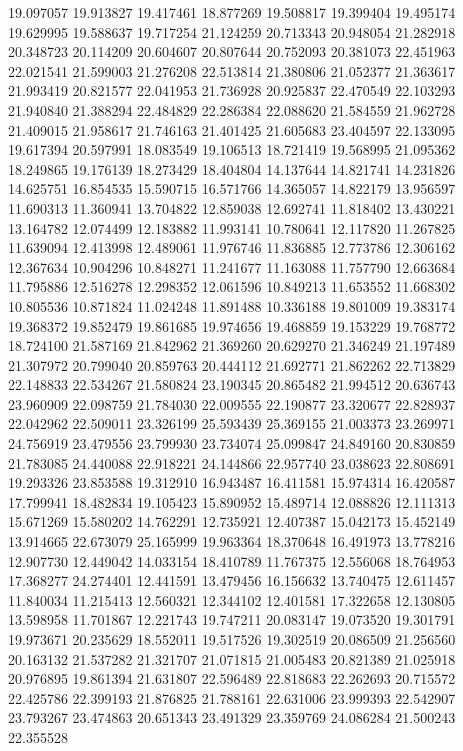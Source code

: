 19.097057
19.913827
19.417461
18.877269
19.508817
19.399404
19.495174
19.629995
19.588637
19.717254
21.124259
20.713343
20.948054
21.282918
20.348723
20.114209
20.604607
20.807644
20.752093
20.381073
22.451963
22.021541
21.599003
21.276208
22.513814
21.380806
21.052377
21.363617
21.993419
20.821577
22.041953
21.736928
20.925837
22.470549
22.103293
21.940840
21.388294
22.484829
22.286384
22.088620
21.584559
21.962728
21.409015
21.958617
21.746163
21.401425
21.605683
23.404597
22.133095
19.617394
20.597991
18.083549
19.106513
18.721419
19.568995
21.095362
18.249865
19.176139
18.273429
18.404804
14.137644
14.821741
14.231826
14.625751
16.854535
15.590715
16.571766
14.365057
14.822179
13.956597
11.690313
11.360941
13.704822
12.859038
12.692741
11.818402
13.430221
13.164782
12.074499
12.183882
11.993141
10.780641
12.117820
11.267825
11.639094
12.413998
12.489061
11.976746
11.836885
12.773786
12.306162
12.367634
10.904296
10.848271
11.241677
11.163088
11.757790
12.663684
11.795886
12.516278
12.298352
12.061596
10.849213
11.653552
11.668302
10.805536
10.871824
11.024248
11.891488
10.336188
19.801009
19.383174
19.368372
19.852479
19.861685
19.974656
19.468859
19.153229
19.768772
18.724100
21.587169
21.842962
21.369260
20.629270
21.346249
21.197489
21.307972
20.799040
20.859763
20.444112
21.692771
21.862262
22.713829
22.148833
22.534267
21.580824
23.190345
20.865482
21.994512
20.636743
23.960909
22.098759
21.784030
22.009555
22.190877
23.320677
22.828937
22.042962
22.509011
23.326199
25.593439
25.369155
21.003373
23.269971
24.756919
23.479556
23.799930
23.734074
25.099847
24.849160
20.830859
21.783085
24.440088
22.918221
24.144866
22.957740
23.038623
22.808691
19.293326
23.853588
19.312910
16.943487
16.411581
15.974314
16.420587
17.799941
18.482834
19.105423
15.890952
15.489714
12.088826
12.111313
15.671269
15.580202
14.762291
12.735921
12.407387
15.042173
15.452149
13.914665
22.673079
25.165999
19.963364
18.370648
16.491973
13.778216
12.907730
12.449042
14.033154
18.410789
11.767375
12.556068
18.764953
17.368277
24.274401
12.441591
13.479456
16.156632
13.740475
12.611457
11.840034
11.215413
12.560321
12.344102
12.401581
17.322658
12.130805
13.598958
11.701867
12.221743
19.747211
20.083147
19.073520
19.301791
19.973671
20.235629
18.552011
19.517526
19.302519
20.086509
21.256560
20.163132
21.537282
21.321707
21.071815
21.005483
20.821389
21.025918
20.976895
19.861394
21.631807
22.596489
22.818683
22.262693
20.715572
22.425786
22.399193
21.876825
21.788161
22.631006
23.999393
22.542907
23.793267
23.474863
20.651343
23.491329
23.359769
24.086284
21.500243
22.355528
